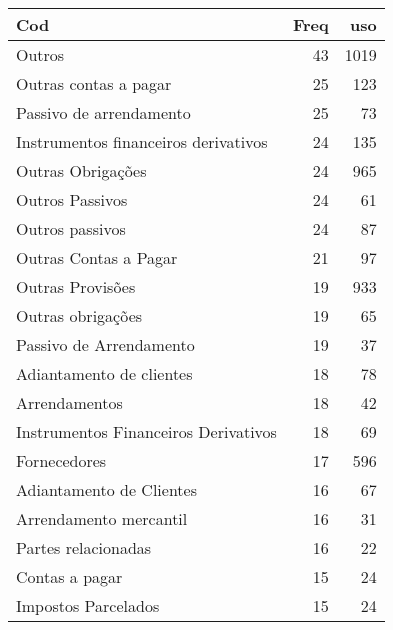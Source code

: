\begin{table}[ht]
\centering
\begin{tabular}{lrr}
  \hline
Cod & Freq & uso \\ 
  \hline
Outros &  43 & 1019 \\ 
  Outras contas a pagar &  25 & 123 \\ 
  Passivo de arrendamento &  25 &  73 \\ 
  Instrumentos financeiros derivativos &  24 & 135 \\ 
  Outras Obrigações &  24 & 965 \\ 
  Outros Passivos &  24 &  61 \\ 
  Outros passivos &  24 &  87 \\ 
  Outras Contas a Pagar &  21 &  97 \\ 
  Outras Provisões &  19 & 933 \\ 
  Outras obrigações &  19 &  65 \\ 
  Passivo de Arrendamento &  19 &  37 \\ 
  Adiantamento de clientes &  18 &  78 \\ 
  Arrendamentos &  18 &  42 \\ 
  Instrumentos Financeiros Derivativos &  18 &  69 \\ 
  Fornecedores &  17 & 596 \\ 
  Adiantamento de Clientes &  16 &  67 \\ 
  Arrendamento mercantil &  16 &  31 \\ 
  Partes relacionadas &  16 &  22 \\ 
  Contas a pagar &  15 &  24 \\ 
  Impostos Parcelados &  15 &  24 \\ 
   \hline
\end{tabular}
\end{table}
